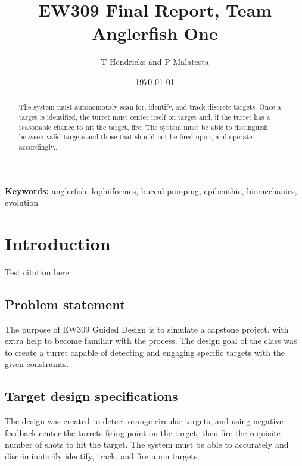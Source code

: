 \documentclass{article}
\title{EW309 Final Report, Team Anglerfish One}
\author{T Hendricks and P Malatesta}
\date{\today}
\begin{document}
\maketitle

\begin{abstract}
The system must autonomously scan for, identify, and track discrete targets. Once a target is identified, the turret must center itself on target and, if the turret has a reasonable chance to hit the target, fire. The system must be able to distinguish between valid targets and those that should not be fired upon, and operate accordingly..
\end{abstract}

{\scriptsize \textbf{Keywords:} anglerfish, lophiiformes, buccal pumping, epibenthic, biomechanics, evolution}

\section{Introduction}
Test citation here \cite{buck2020go}.
\subsection{Problem statement}
The purpose of EW309 Guided Design is to simulate a capstone project, with extra help to become familiar with the process. The design goal of the class was to create a turret capable of detecting and engaging specific targets with the given constraints. 


\subsection{Target design specifications}
The design was created to detect orange circular targets, and using negative feedback center the turrets firing point on the target, then fire the requisite number of shots to hit the target. The system must be able to accurately and discriminatorily identify, track, and fire upon targets.
\end{document}
